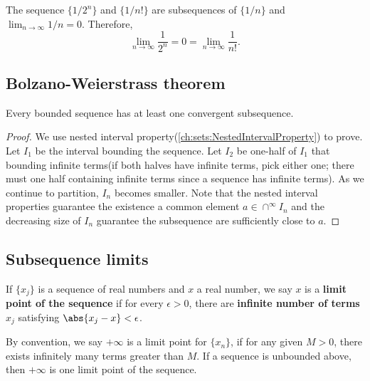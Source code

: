 \begin{refsection}
\begin{example}\cite[39]{johnsonbaugh2010foundations}The sequence $\{1/2^n\}$ and $\{1/n!\}$ are subsequences of $\{1/n\}$ and $\lim_{n\to \infty }1/n = 0$. Therefore, 
	$$\lim_{n\to\infty} \frac{1}{2^n} = 0 =\lim_{n\to\infty} \frac{1}{n!}.$$
\end{example}



\subsection{Bolzano-Weierstrass theorem}
\begin{theorem}\label{ch:sequences-series:th:Bolzano-Weierstrasstheorem}
\cite[62]{abbott2001understanding}
Every bounded sequence has at least one convergent subsequence.
\end{theorem}
\begin{proof}
 We use nested interval property(\autoref{ch:sets:NestedIntervalProperty}) to prove. Let $I_1$ be the interval bounding the sequence. Let $I_2$ be one-half of $I_1$ that bounding infinite terms(if both halves have infinite terms, pick either one; there must one half containing infinite terms since a sequence has infinite terms). As we continue to partition, $I_n$ becomes smaller. Note that the nested interval properties guarantee the existence a common element $a \in \cap^{\infty} I_n$ and the decreasing size of $I_n$ guarantee the subsequence are sufficiently close to $a$.	
\end{proof}


\subsection{Subsequence limits}

\begin{definition}\cite[79]{strichartz2000way} 
	If $\{x_j\}$ is a sequence of real numbers and $x$ a real number, we say $x$ is a \textbf{limit point of the sequence} if for every $\epsilon > 0$, there are \textbf{infinite number of terms $x_j$} satisfying $\abs{x_j - x} < \epsilon$. 
\end{definition}

\begin{remark}
By convention, we say $+\infty$ is a limit point for $\{x_n\}$, if for any given $M > 0$, there exists infinitely many terms greater than $M$. If a sequence is unbounded above, then $+\infty$ is one limit point of the sequence.
	

\end{remark}
\end{refsection}
